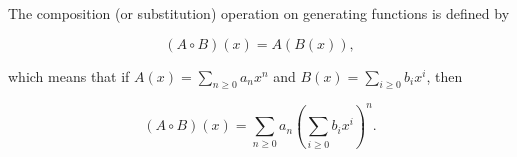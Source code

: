 The composition (or substitution) operation on generating functions is defined by

$$(A \circ B)(x) = A(B(x)),$$

which means that if $A(x) = \sum_{n \geq 0} a_n x^n$ and $B(x) = \sum_{i \geq 0} b_i x^i$, then

$$(A \circ B)(x) = \sum_{n \geq 0} a_n \left( \sum_{i \geq 0} b_i x^i \right)^n.$$
